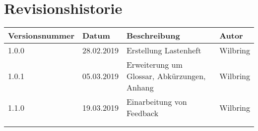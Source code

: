 \section*{Revisionshistorie}

\begin{tabular}{|p{3cm}|p{2cm}|p{5.5cm}|p{2cm}|}
\hline
Versionsnummer  & Datum         & Beschreibung          & Autor     \\
\hline
 1.0.0          & 28.02.2019    & Erstellung Lastenheft & Wilbring  \\\hline
 1.0.1          & 05.03.2019    & Erweiterung um Glossar, Abkürzungen, Anhang  & Wilbring      \\\hline
 1.1.0          & 19.03.2019    & Einarbeitung von Feedback & Wilbring \\\hline
                &               &                       &           \\\hline
                &               &                       &           \\\hline
\end{tabular}

